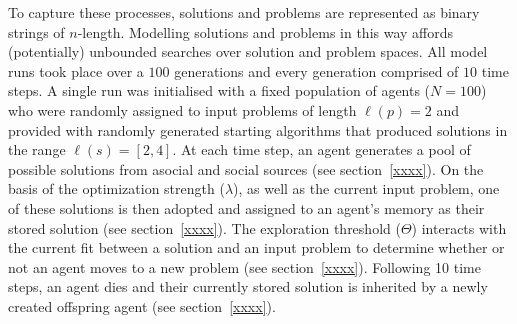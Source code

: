 \documentclass{article}
\begin{document}
To capture these processes, solutions and problems are represented as binary strings of $n$-length. Modelling solutions and problems in this way affords (potentially) unbounded searches over solution and problem spaces. All model runs took place over a $100$ generations and every generation comprised of $10$ time steps. A single run was initialised with a fixed population of agents ($N=100$) who were randomly assigned to input problems of length $\ell(p)=2$ and provided with randomly generated starting algorithms that produced solutions in the range $\ell(s)=[2,4]$. At each time step, an agent generates a pool of possible solutions from asocial and social sources (see section~\ref{xxxx}). On the basis of the optimization strength ($\lambda$), as well as the current input problem, one of these solutions is then adopted and assigned to an agent's memory as their stored solution (see section~\ref{xxxx}). The exploration threshold ($\Theta$) interacts with the current fit between a solution and an input problem to determine whether or not an agent moves to a new problem (see section~\ref{xxxx}). Following 10 time steps, an agent dies and their currently stored solution is inherited by a newly created offspring agent (see section~\ref{xxxx}).

\end{document}
